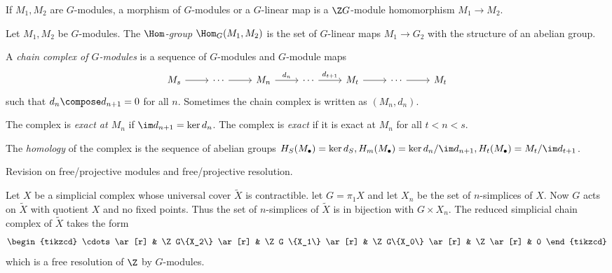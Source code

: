 \documentclass[a4paper]{article}
\begin{document}
\begin{definition}
  If \(M_1, M_2\) are \(G\)-modules, a morphism of \(G\)-modules or a \(G\)-linear map is a \(\Z G\)-module homomorphism \(M_1 \to M_2\).
\end{definition}

\begin{definition}
  Let \(M_1, M_2\) be \(G\)-modules. The \emph{\(\Hom\)-group} \(\Hom_G(M_1, M_2)\) is the set of \(G\)-linear maps \(M_1 \to G_2\) with the structure of an abelian group.
\end{definition}

\begin{definition}
  A \emph{chain complex of \(G\)-modules} is a sequence of \(G\)-modules and \(G\)-module maps
  \[
    \begin{tikzcd}
      M_s \ar[r] & \cdots \ar[r] & M_n \ar[r, "d_n"] & \cdots \ar[r, "d_{t + 1}"] & M_t \ar[r] & \cdots \ar[r] & M_t
    \end{tikzcd}
  \]
  such that \(d_n \compose d_{n + 1} = 0\) for all \(n\). Sometimes the chain complex is written as \((M_n, d_n)\).

  The complex is \emph{exact at \(M_n\)} if \(\im d_{n + 1} = \ker d_n\). The complex is \emph{exact} if it is exact at \(M_n\) for all \(t < n < s\).

  The \emph{homology} of the complex is the sequence of abelian groups \(H_S(M_\bullet) = \ker d_S, H_m(M_\bullet) = \ker d_n/\im d_{n + 1}, H_t(M_\bullet) = M_t/\im d_{t + 1}\).
\end{definition}

Revision on free/projective modules and free/projective resolution.

\begin{eg}
  Let \(X\) be a simplicial complex whose universal cover \(\widetilde X\) is contractible. let \(G = \pi_1X\) and let \(X_n\) be the set of \(n\)-simplices of \(X\). Now \(G\) acts on \(\widetilde X\) with quotient \(X\) and no fixed points. Thus the set of \(n\)-simplices of \(\widetilde X\) is in bijection with \(G \times X_n\). The reduced simplicial chain complex of \(\widetilde X\) takes the form
  \[
    \begin{tikzcd}
      \cdots \ar[r] & \Z G\{X_2\} \ar[r] & \Z G \{X_1\} \ar[r] & \Z G\{X_0\} \ar[r] & \Z \ar[r] & 0
    \end{tikzcd}
  \]
  which is a free resolution of \(\Z\) by \(G\)-modules.
\end{eg}
\end{document}
